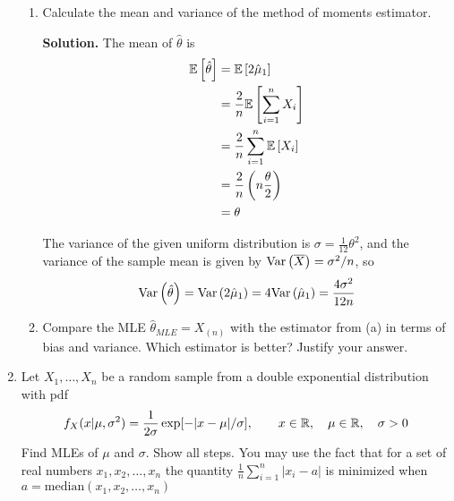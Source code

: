\documentclass[titlepage]{article}
\begin{document}
\begin{enumerate}
\begin{enumerate}
  \item Calculate the mean and variance of the method of moments estimator.

  \textbf{Solution.} The mean of $\hat{\theta}$ is
  \[\begin{aligned}
  \mathbb{E}\left[ \hat{\theta} \right] &= \mathbb{E}\left[ 2\hat{\mu}_1 \right] \\
                    &= \frac{2}{n} \mathbb{E}\left[ \sum_{i=1}^n X_i \right] \\
                    &= \frac{2}{n} \sum_{i=1}^n \mathbb{E}\left[ X_i \right] \\
                    &= \frac{2}{n}\left(n\frac{\theta}{2}\right)\\
                    &= \theta
  \end{aligned}\]

  The variance of the given uniform distribution is $\sigma = \frac{1}{12}\theta^2$, and the variance of the sample mean is given by $\text{Var}\left( \overline{X} \right) = \sigma^2 / n$, so
  \[\text{Var}\left( \hat{\theta} \right) = \text{Var}\left( 2\hat{\mu}_1 \right) = 4 \text{Var}\left( \hat{\mu}_1 \right) = \frac{4\sigma^2}{12n}\]

  \item Compare the MLE $\hat{\theta}_{MLE} = X_{(n)}$ with the estimator from (a) in terms of bias and variance. Which estimator is better? Justify your answer.
  \end{enumerate}

\item Let $X_1, \ldots, X_n$ be a random sample from a double exponential distribution with pdf
  \[f_X(x | \mu, \sigma^2) = \frac{1}{2\sigma}\exp[-|x-\mu|/\sigma], \qquad x \in \mathbb{R}, \quad \mu \in \mathbb{R}, \quad \sigma > 0\]
Find MLEs of $\mu$ and $\sigma$. Show all steps. You may use the fact that for a set of real numbers $x_1, x_2, \ldots, x_n$ the quantity $\frac{1}{n}\sum_{i=1}^n |x_i - a|$ is minimized when $a = \text{median}(x_1, x_2, \ldots, x_n)$


\end{enumerate}
\end{document}
